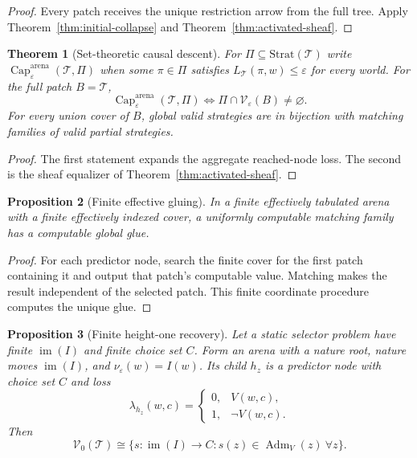 \documentclass[11pt]{article}
\theoremstyle{plain}
\newtheorem{theorem}{Theorem}[section]
\newtheorem{proposition}[theorem]{Proposition}
\theoremstyle{definition}
\theoremstyle{remark}
\newcommand{\im}{\operatorname{im}}
\newcommand{\Capability}{\operatorname{Cap}}
\newcommand{\Adm}{\operatorname{Adm}}
\newcommand{\eps}{\varepsilon}
\begin{document}
\begin{proof}
Every patch receives the unique restriction arrow from the full tree. Apply
Theorem~\ref{thm:initial-collapse} and
Theorem~\ref{thm:activated-sheaf}.
\end{proof}

\begin{theorem}[Set-theoretic causal descent]\label{thm:causal-descent}
For $\Pi\subseteq\mathrm{Strat}(\mathcal T)$ write
$\Capability^{\mathrm{arena}}_\eps(\mathcal T,\Pi)$ when some
$\pi\in\Pi$ satisfies $L_{\mathcal T}(\pi,w)\le\eps$ for every world. For the
full patch $B=\mathcal T$,
\[
\Capability^{\mathrm{arena}}_\eps(\mathcal T,\Pi)
\iff
\Pi\cap\mathscr V_\eps(B)\ne\varnothing.
\]
For every union cover of $B$, global valid strategies are in bijection with
matching families of valid partial strategies.
\end{theorem}

\begin{proof}
The first statement expands the aggregate reached-node loss. The second is the
sheaf equalizer of Theorem~\ref{thm:activated-sheaf}.
\end{proof}

\begin{proposition}[Finite effective gluing]\label{prop:finite-effective-gluing}
In a finite effectively tabulated arena with a finite effectively indexed cover,
a uniformly computable matching family has a computable global glue.
\end{proposition}

\begin{proof}
For each predictor node, search the finite cover for the first patch containing
it and output that patch's computable value. Matching makes the result
independent of the selected patch. This finite coordinate procedure computes the
unique glue.
\end{proof}

\begin{proposition}[Finite height-one recovery]\label{prop:heightone}
Let a static selector problem have finite $\im(I)$ and finite choice set $C$.
Form an arena with a nature root, nature moves $\im(I)$, and
$\nu_\varepsilon(w)=I(w)$. Its child $h_z$ is a predictor node with choice set
$C$ and loss
\[
\lambda_{h_z}(w,c)=
\begin{cases}0,&V(w,c),\\1,&\neg V(w,c).\end{cases}
\]
Then
\[
\mathscr V_0(\mathcal T)
\cong
\{s:\im(I)\to C:s(z)\in\Adm_V(z)\ \forall z\}.
\]
\end{proposition}
\end{document}

